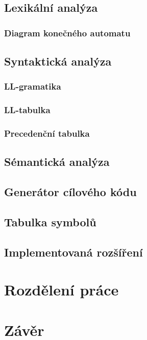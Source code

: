 \documentclass[11pt,a4paper]{article}
\begin{document}
    \subsection{Lexikální analýza}
        \subsubsection{Diagram konečného automatu}
    \subsection{Syntaktická analýza}
        \subsubsection{LL-gramatika}
        \subsubsection{LL-tabulka}
        \subsubsection{Precedenční tabulka}
    \subsection{Sémantická analýza}
    \subsection{Generátor cílového kódu}
    \subsection{Tabulka symbolů}
    \subsection{Implementovaná rozšíření}
\section{Rozdělení práce}
\section{Závěr}
\end{document}

